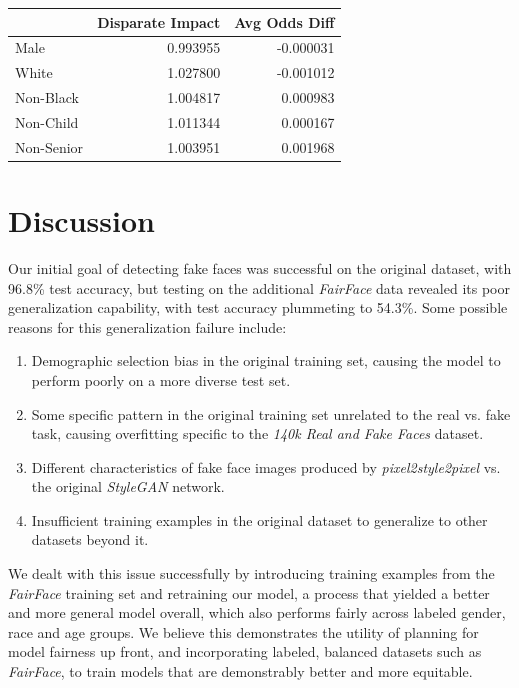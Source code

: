 \documentclass[11pt, letterpaper]{article}
\newenvironment{Figure}
  {\par\medskip\noindent\minipage{\linewidth}}
  {\endminipage\par\medskip}
\providecommand{\tightlist}{%
  \setlength{\itemsep}{0pt}\setlength{\parskip}{0pt}
}
\begin{document}
\begin{multicols}{2}
    \begin{Figure}
      \centering
      \label{fairnessmetrics}
      \begin{tabular}{lrr}
      \toprule
      {} &  Disparate Impact &  Avg Odds Diff \\
      \midrule
      Male       &                0.993955 &                -0.000031 \\
      White      &                1.027800 &                -0.001012 \\
      Non-Black  &                1.004817 &                 0.000983 \\
      Non-Child  &                1.011344 &                 0.000167 \\
      Non-Senior &                1.003951 &                 0.001968 \\
      \bottomrule
      \end{tabular}
      \end{Figure}

  \section{Discussion}
  Our initial goal of detecting fake faces was successful on the
  original dataset, with 96.8\% test accuracy, but testing on the
  additional \emph{FairFace} data revealed its poor generalization
  capability, with test accuracy plummeting to 54.3\%. Some possible
  reasons for this generalization failure include:

  \begin{enumerate}
    \tightlist
  \item Demographic selection bias in the original training set,
    causing the model to perform poorly on a more diverse test set.
  \item Some specific pattern in the original training set unrelated to
    the real vs. fake task, causing overfitting specific to the
    \emph{140k Real and Fake Faces} dataset.
  \item Different characteristics of fake face images produced by
    \emph{pixel2style2pixel} vs. the original \emph{StyleGAN} network.
  \item Insufficient training examples in the original dataset to
    generalize to other datasets beyond it.
  \end{enumerate}

  We dealt with this issue successfully by introducing training
  examples from the \emph{FairFace} training set and retraining our
  model, a process that yielded a better and more general model
  overall, which also performs fairly across labeled gender, race and
  age groups.  We believe this demonstrates the utility of planning
  for model fairness up front, and incorporating labeled, balanced
  datasets such as \emph{FairFace}, to train models that are
  demonstrably better and more equitable.


\end{multicols}
\end{document}
